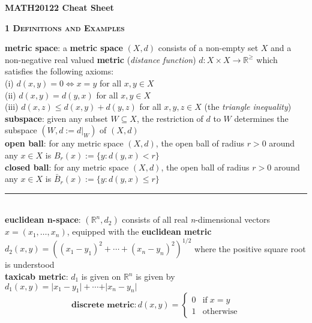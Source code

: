 \documentclass[a4paper]{article}
\newcommand*\abs[1]{\vert #1 \vert}
\newcommand*\linesep[0]{\noindent\rule{\textwidth}{0.5pt}\\}
\begin{document}

\begin{center}
	\huge{\textbf{MATH20122 Cheat Sheet}}\\
\end{center}

\begin{framed}
	\begin{center}
		\textbf{\textsc{1 Definitions and Examples}}
	\end{center}
	\textbf{metric space}: a \textbf{metric space} $(X, d)$ consists of a non-empty set $X$ and a non-negative real valued \textbf{metric} (\textit{distance function}) $d: X \times X \rightarrow \mathbb{R}^\geq$ which satisfies the following axioms:\\
	\noindent
	(i) $d(x, y) = 0 \iff x = y$ for all $x, y \in X$\\
	(ii) $d(x, y) = d(y, x)$ for all $x, y \in X$\\
	(iii) $d(x, z) \leq d(x, y) + d(y, z)$ for all $x, y, z \in X$ (the \textit{triangle inequality})\\
	
	\noindent
	\textbf{subspace}: given any subset $W \subseteq X$, the restriction of $d$ to $W$ determines the subspace $(W, d := d\vert_W)$ of $(X, d)$\\
	
	\noindent
 	\textbf{open ball}: for any metric space $(X, d)$, the open ball of radius $r > 0$ around any $x \in X$ is $B_r(x) := \{y : d(y, x) < r\}$\\
 	
 	\noindent
 	\textbf{closed ball}: for any metric space $(X, d)$, the open ball of radius $r > 0$ around any $x \in X$ is $\bar{B}_r(x) := \{y : d(y, x) \leq r\}$
 	
 	\linesep
 	\noindent
 	\textbf{euclidean n-space}: $(\mathbb{R}^n, d_2)$ consists of all real \textit{n}-dimensional vectors $x = (x_1, \dots, x_n)$, equipped with the \textbf{euclidean metric} $d_2(x, y) = ((x_1 - y_1)^2 + \cdots + (x_n - y_n)^2)^{1/2}$ where the positive square root is understood\\
 	
 	\noindent
 	\textbf{taxicab metric}: $d_1$ is given on $\mathbb{R}^n$ is given by $d_1(x, y) = \abs{x_1 - y_1} + \cdots + \abs{x_n - y_n}$\\
 	
 	\[ \textbf{discrete metric}: d(x, y) = \begin{cases} 
      0 & \text{if} \; x = y \\
      1 & \text{otherwise}
      \end{cases}
	\]\\
 	

\end{framed}
\end{document}
